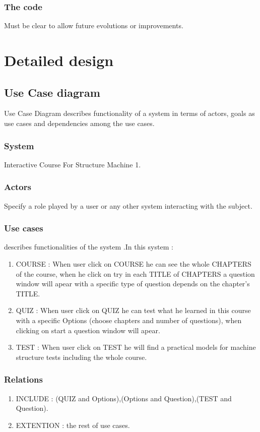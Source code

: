\subsubsection{The code}
Must be clear to allow future evolutions or improvements.\cite{github}






\section{Detailed design}

\subsection{Use Case diagram}
Use Case Diagram describes functionality of a system in terms of actors, goals as use cases and dependencies among the use cases.\cite{Techopedia-UML}
\subsubsection{System}
Interactive Course For Structure Machine 1.
\subsubsection{Actors}
Specify a role played by a user or any other system interacting with the subject.\cite{Techopedia-UML}
\subsubsection{Use cases}
describes functionalities of the system .In this system :
\begin{enumerate}
	\item COURSE : When user click on COURSE he can see the whole CHAPTERS of the course, when he click on try in each TITLE of CHAPTERS a question window will apear with a specific type of question depends on the chapter's TITLE.
	\item QUIZ : When user click on QUIZ he can test what he learned in this course with a specific Options (choose chapters and number of questions), when clicking on start a question window will apear.
	\item TEST : When user click on TEST he will find a practical models for machine structure tests including the whole course.
\end{enumerate}

\subsubsection{Relations}
\begin{enumerate}
	\item INCLUDE : (QUIZ and Options),(Options and Question),(TEST and Question).
	\item EXTENTION : the rest of use cases.
\end{enumerate}

